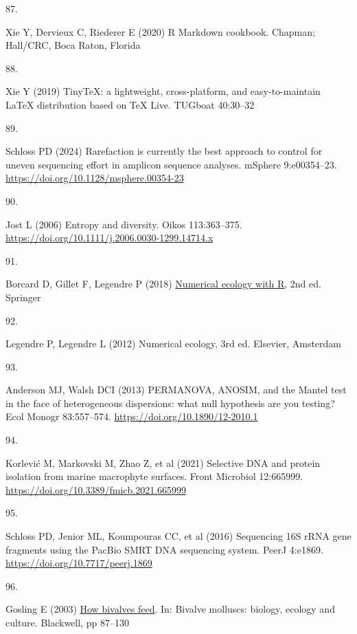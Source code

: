 \documentclass[
  12 pt,
]{article}
\newlength{\cslhangindent}
\newlength{\csllabelwidth}
\newenvironment{CSLReferences}[2] %
 {\begin{list}{}{%
  \setlength{\itemindent}{0pt}
  \setlength{\leftmargin}{0pt}
  \setlength{\parsep}{0pt}
  \ifodd #1
   \setlength{\leftmargin}{\cslhangindent}
   \setlength{\itemindent}{-1\cslhangindent}
  \fi
  \setlength{\itemsep}{#2\baselineskip}}}
 {\end{list}}
\newcommand{\CSLLeftMargin}[1]{\parbox[t]{\csllabelwidth}{\strut#1\strut}}
\newcommand{\CSLRightInline}[1]{\parbox[t]{\linewidth - \csllabelwidth}{\strut#1\strut}}
\begin{document}
\begin{CSLReferences}{0}{0}
\CSLLeftMargin{87. }%
\CSLRightInline{Xie Y, Dervieux C, Riederer E (2020) R {Markdown} cookbook. Chapman; Hall/CRC, Boca Raton, Florida}

\CSLLeftMargin{88. }%
\CSLRightInline{Xie Y (2019) TinyTeX: {a} lightweight, cross-platform, and easy-to-maintain LaTeX distribution based on {TeX Live}. TUGboat 40:30--32}

\CSLLeftMargin{89. }%
\CSLRightInline{Schloss PD (2024) Rarefaction is currently the best approach to control for uneven sequencing effort in amplicon sequence analyses. mSphere 9:e00354--23. \url{https://doi.org/10.1128/msphere.00354-23}}

\CSLLeftMargin{90. }%
\CSLRightInline{Jost L (2006) Entropy and diversity. Oikos 113:363--375. \url{https://doi.org/10.1111/j.2006.0030-1299.14714.x}}

\CSLLeftMargin{91. }%
\CSLRightInline{Borcard D, Gillet F, Legendre P (2018) \href{https://doi.org/10.1007/978-3-319-71404-2}{Numerical ecology with {R}}, 2nd ed. Springer}

\CSLLeftMargin{92. }%
\CSLRightInline{Legendre P, Legendre L (2012) Numerical ecology, 3rd ed. Elsevier, Amsterdam}

\CSLLeftMargin{93. }%
\CSLRightInline{Anderson MJ, Walsh DCI (2013) PERMANOVA, ANOSIM, and the Mantel test in the face of heterogeneous dispersions: what null hypothesis are you testing? Ecol Monogr 83:557--574. \url{https://doi.org/10.1890/12-2010.1}}

\CSLLeftMargin{94. }%
\CSLRightInline{Korlević M, Markovski M, Zhao Z, et al (2021) Selective {DNA} and protein isolation from marine macrophyte surfaces. Front Microbiol 12:665999. \url{https://doi.org/10.3389/fmicb.2021.665999}}

\CSLLeftMargin{95. }%
\CSLRightInline{Schloss PD, Jenior ML, Koumpouras CC, et al (2016) Sequencing {16S rRNA} gene fragments using the {PacBio SMRT DNA} sequencing system. PeerJ 4:e1869. \url{https://doi.org/10.7717/peerj.1869}}

\CSLLeftMargin{96. }%
\CSLRightInline{Gosling E (2003) \href{https://doi.org/10.1002/9780470995532.ch4}{How bivalves feed}. In: Bivalve molluscs: biology, ecology and culture. Blackwell, pp 87--130}


\end{CSLReferences}
\end{document}
